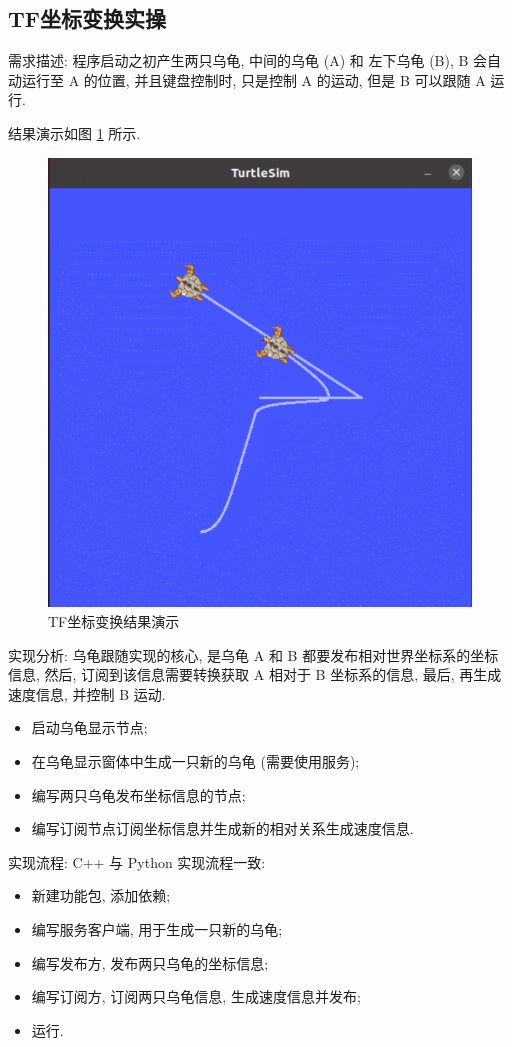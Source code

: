 \documentclass[openany, fontset=windowsold]{ctexbook}
\theoremstyle{kaiti}
\theoremstyle{normal}
\begin{document}
\subsection{TF坐标变换实操}

需求描述: 程序启动之初产生两只乌龟, 中间的乌龟 (A) 和 左下乌龟 (B), B 会自动运行至 A 的位置, 并且键盘控制时, 只是控制 A 的运动, 但是 B 可以跟随 A 运行.

结果演示如图 \ref{fig:ros_demo_turtle_following_02} 所示.

\begin{figure}[!ht]
  \centering
  \includegraphics[width=.5\textwidth]{ros_demo_turtle_following_02.png}
  \caption{TF坐标变换结果演示}
  \label{fig:ros_demo_turtle_following_02}
\end{figure}

实现分析: 乌龟跟随实现的核心, 是乌龟 A 和 B 都要发布相对世界坐标系的坐标信息, 然后, 订阅到该信息需要转换获取 A 相对于 B 坐标系的信息, 最后, 再生成速度信息, 并控制 B 运动.

\begin{itemize}
  \item 启动乌龟显示节点;
  \item 在乌龟显示窗体中生成一只新的乌龟 (需要使用服务);
  \item 编写两只乌龟发布坐标信息的节点;
  \item 编写订阅节点订阅坐标信息并生成新的相对关系生成速度信息.
\end{itemize}

实现流程: C++ 与 Python 实现流程一致:

\begin{itemize}
  \item 新建功能包, 添加依赖;
  \item 编写服务客户端, 用于生成一只新的乌龟;
  \item 编写发布方, 发布两只乌龟的坐标信息;
  \item 编写订阅方, 订阅两只乌龟信息, 生成速度信息并发布;
  \item 运行.
\end{itemize}
\end{document}
